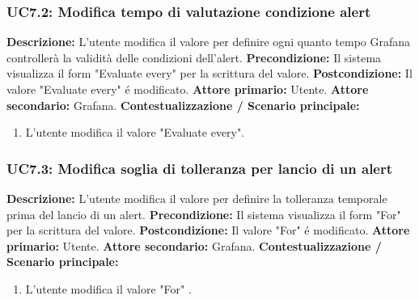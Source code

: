                 \subsubsection{UC7.2: Modifica tempo di valutazione condizione alert}
                    \textbf{Descrizione:} L’utente modifica il valore per definire ogni quanto tempo Grafana controllerà la validità delle condizioni dell'alert.  
                    \newline
                    \textbf{Precondizione:} Il sistema visualizza il form "Evaluate every" per la scrittura del valore.
                    \newline
                    \textbf{Postcondizione:} Il valore "Evaluate every" é modificato.
                    \newline
                    \textbf{Attore primario:} Utente.
                    \newline
                    \textbf{Attore secondario:} Grafana.
                    \newline
                    \textbf{Contestualizzazione / Scenario principale:} \begin{enumerate}
                            \item L'utente modifica il valore "Evaluate every".
                        \end{enumerate}
                
                \subsubsection{UC7.3: Modifica soglia di tolleranza per lancio di un alert}
                    \textbf{Descrizione:} L’utente modifica il valore per definire la tolleranza temporale prima del lancio di un alert.  
                    \newline
                    \textbf{Precondizione:} Il sistema visualizza il form "For" per la scrittura del valore.
                    \newline
                    \textbf{Postcondizione:} Il valore "For" é modificato.
                    \newline
                    \textbf{Attore primario:} Utente.
                    \newline
                    \textbf{Attore secondario:} Grafana.
                    \newline
                    \textbf{Contestualizzazione / Scenario principale:} \begin{enumerate}
                            \item L'utente modifica il valore "For" .
                        \end{enumerate}
                
